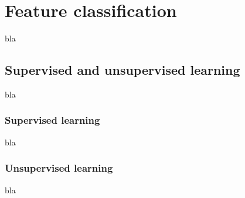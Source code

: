 \chapter{Feature classification}
\label{chap:classification}

\noindent bla

\section{Supervised and unsupervised learning}

\noindent bla
\newline

\subsection{Supervised learning}

\vspace{\baselineskip}
\noindent bla
\newline

\subsection{Unsupervised learning}

\vspace{\baselineskip}
\noindent bla
\newline


